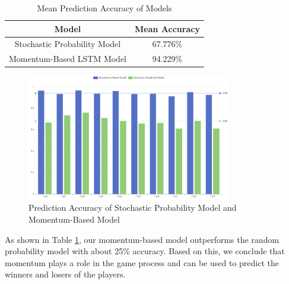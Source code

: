 \begin{table}[h]
	\centering
	\caption{Mean Prediction Accuracy of Models} 
        \vspace{8pt}
	\label{tab:mean_acc}
	\begin{tabular}{c|c}
		\toprule[1.5pt]
		Model & Mean Accuracy\\
		\midrule[1pt]
		Stochastic Probability Model & 67.776\% \\
		Momentum-Based LSTM Model & 94.229\% \\
		\bottomrule[1.5pt]
	\end{tabular}
\end{table}

\begin{figure}[h]
    \centering
    \includegraphics[width=0.8\textwidth]{figure/acc_lstm_stochastic.png}
    \caption{Prediction Accuracy of Stochastic Probability Model and Momentum-Based Model 
    \textnormal{}}
    \label{fig:acc_lstm_stochastic}
\end{figure}

As shown in Table \ref{tab:mean_acc}, our momentum-based model outperforms the random probability model with about 25\% accuracy. Based on this, we conclude that momentum plays a role in the game process and can be used to predict the winners and losers of the players.